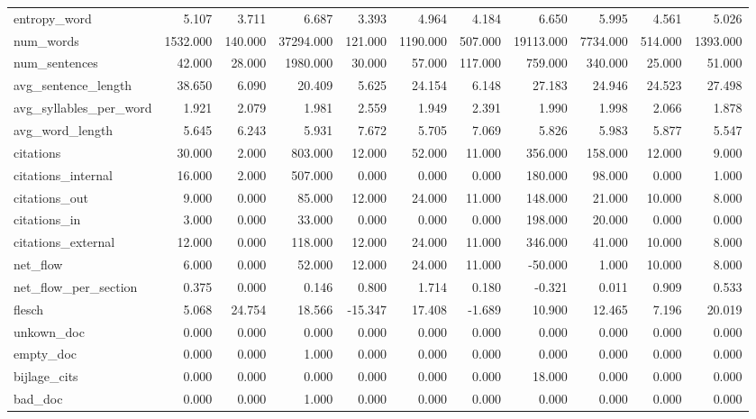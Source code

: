 \begin{tabular}{lrrrrrrrrrr}
\cline{1-11}
entropy\_word & 5.107 & 3.711 & 6.687 & 3.393 & 4.964 & 4.184 & 6.650 & 5.995 & 4.561 & 5.026 \\
\cline{1-11}
num\_words & 1532.000 & 140.000 & 37294.000 & 121.000 & 1190.000 & 507.000 & 19113.000 & 7734.000 & 514.000 & 1393.000 \\
\cline{1-11}
num\_sentences & 42.000 & 28.000 & 1980.000 & 30.000 & 57.000 & 117.000 & 759.000 & 340.000 & 25.000 & 51.000 \\
\cline{1-11}
avg\_sentence\_length & 38.650 & 6.090 & 20.409 & 5.625 & 24.154 & 6.148 & 27.183 & 24.946 & 24.523 & 27.498 \\
\cline{1-11}
avg\_syllables\_per\_word & 1.921 & 2.079 & 1.981 & 2.559 & 1.949 & 2.391 & 1.990 & 1.998 & 2.066 & 1.878 \\
\cline{1-11}
avg\_word\_length & 5.645 & 6.243 & 5.931 & 7.672 & 5.705 & 7.069 & 5.826 & 5.983 & 5.877 & 5.547 \\
\cline{1-11}
citations & 30.000 & 2.000 & 803.000 & 12.000 & 52.000 & 11.000 & 356.000 & 158.000 & 12.000 & 9.000 \\
\cline{1-11}
citations\_internal & 16.000 & 2.000 & 507.000 & 0.000 & 0.000 & 0.000 & 180.000 & 98.000 & 0.000 & 1.000 \\
\cline{1-11}
citations\_out & 9.000 & 0.000 & 85.000 & 12.000 & 24.000 & 11.000 & 148.000 & 21.000 & 10.000 & 8.000 \\
\cline{1-11}
citations\_in & 3.000 & 0.000 & 33.000 & 0.000 & 0.000 & 0.000 & 198.000 & 20.000 & 0.000 & 0.000 \\
\cline{1-11}
citations\_external & 12.000 & 0.000 & 118.000 & 12.000 & 24.000 & 11.000 & 346.000 & 41.000 & 10.000 & 8.000 \\
\cline{1-11}
net\_flow & 6.000 & 0.000 & 52.000 & 12.000 & 24.000 & 11.000 & -50.000 & 1.000 & 10.000 & 8.000 \\
\cline{1-11}
net\_flow\_per\_section & 0.375 & 0.000 & 0.146 & 0.800 & 1.714 & 0.180 & -0.321 & 0.011 & 0.909 & 0.533 \\
\cline{1-11}
flesch & 5.068 & 24.754 & 18.566 & -15.347 & 17.408 & -1.689 & 10.900 & 12.465 & 7.196 & 20.019 \\
\cline{1-11}
unkown\_doc & 0.000 & 0.000 & 0.000 & 0.000 & 0.000 & 0.000 & 0.000 & 0.000 & 0.000 & 0.000 \\
\cline{1-11}
empty\_doc & 0.000 & 0.000 & 1.000 & 0.000 & 0.000 & 0.000 & 0.000 & 0.000 & 0.000 & 0.000 \\
\cline{1-11}
bijlage\_cits & 0.000 & 0.000 & 0.000 & 0.000 & 0.000 & 0.000 & 18.000 & 0.000 & 0.000 & 0.000 \\
\cline{1-11}
bad\_doc & 0.000 & 0.000 & 1.000 & 0.000 & 0.000 & 0.000 & 0.000 & 0.000 & 0.000 & 0.000 \\
\cline{1-11}
\bottomrule
\end{tabular}
